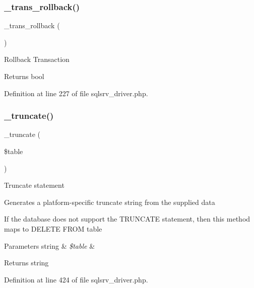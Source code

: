\subsubsection{\texorpdfstring{\_trans\_rollback()}{\_trans\_rollback()}}
{\footnotesize\ttfamily \+\_\+trans\+\_\+rollback (\begin{DoxyParamCaption}{ }\end{DoxyParamCaption})\hspace{0.3cm}{\ttfamily [protected]}}

Rollback Transaction

\begin{DoxyReturn}{Returns}
bool 
\end{DoxyReturn}


Definition at line 227 of file sqlsrv\+\_\+driver.\+php.

\mbox{\label{class_c_i___d_b__sqlsrv__driver_aa029600528fc1ce660a23ff4b4667f95}} 
\subsubsection{\texorpdfstring{\_truncate()}{\_truncate()}}
{\footnotesize\ttfamily \+\_\+truncate (\begin{DoxyParamCaption}\item[{}]{\$table }\end{DoxyParamCaption})\hspace{0.3cm}{\ttfamily [protected]}}

Truncate statement

Generates a platform-\/specific truncate string from the supplied data

If the database does not support the T\+R\+U\+N\+C\+A\+TE statement, then this method maps to \textquotesingle{}D\+E\+L\+E\+TE F\+R\+OM table\textquotesingle{}


\begin{DoxyParams}[1]{Parameters}
string & {\em \$table} & \\
\hline
\end{DoxyParams}
\begin{DoxyReturn}{Returns}
string 
\end{DoxyReturn}


Definition at line 424 of file sqlsrv\+\_\+driver.\+php.


